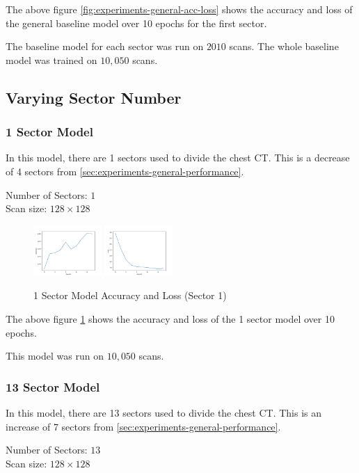 \documentclass[10pt,twocolumn,letterpaper]{article}
\begin{document}
      The above figure \ref{fig:experiments-general-acc-loss} shows the accuracy and loss of the general baseline model over 10 epochs for the first sector.

      The baseline model for each sector was run on $2010$ scans. The whole baseline model was trained on $10,050$ scans.
   \subsection{Varying Sector Number} \label{sec:experiments-sector}
      \subsubsection{1 Sector Model} \label{sec:experiments-sector-13}
         In this model, there are 1 sectors used to divide the chest CT. This is a decrease of 4 sectors from \ref{sec:experiments-general-performance}.
         \begin{center}
            Number of Sectors: $1$ \\
            Scan size: $128 \times 128$
         \end{center}

         \begin{figure}[h]
            \centering
            \includegraphics[width=0.23\textwidth]{./images/training_accuracy_13_sector_128_px.png}
            \includegraphics[width=0.23\textwidth]{./images/training_loss_13_sector_128_px.png}
            \caption{1 Sector Model Accuracy and Loss (Sector 1)}
            \label{fig:experiments-1-sector-acc-loss}
         \end{figure}

         The above figure \ref{fig:experiments-1-sector-acc-loss} shows the accuracy and loss of the 1 sector model over 10 epochs.

         This model was run on $10,050$ scans.

      \subsubsection{13 Sector Model} \label{sec:experiments-sector-13}
         In this model, there are 13 sectors used to divide the chest CT. This is an increase of 7 sectors from \ref{sec:experiments-general-performance}.
         \begin{center}
            Number of Sectors: $13$ \\
            Scan size: $128 \times 128$
         \end{center}
\end{document}
